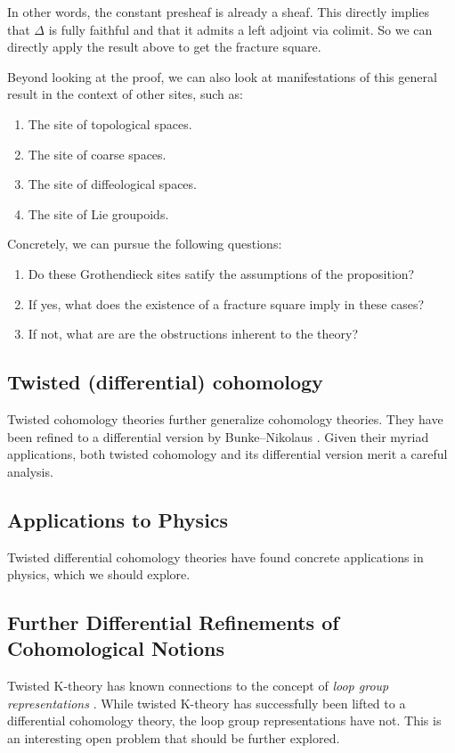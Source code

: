 \documentclass[10pt]{amsart}
\theoremstyle{definition}
\theoremstyle{remark}
\numberwithin{equation}{section}
\begin{document}
In other words, the constant presheaf is already a sheaf. This directly implies that $\Delta$ is fully faithful and that it admits a left adjoint via colimit. So we can directly apply the result above to get the fracture square.

Beyond looking at the proof, we can also look at manifestations of this general result in the context of other sites, such as:
\begin{enumerate}
  \item The site of topological spaces.
  \item The site of coarse spaces.
  \item The site of diffeological spaces.
  \item The site of Lie groupoids.
\end{enumerate}

Concretely, we can pursue the following questions:
\begin{enumerate}
  \item Do these Grothendieck sites satify the assumptions of the proposition?
  \item If yes, what does the existence of a fracture square imply in these cases?
  \item If not, what are are the obstructions inherent to the theory?
\end{enumerate}

\subsection{Twisted (differential) cohomology}
Twisted cohomology theories further generalize cohomology theories. They have been refined to a differential version by Bunke--Nikolaus \cite{bunkenikolaus2019twisted}. Given their myriad applications, both twisted cohomology and its differential version merit a careful analysis.

\subsection{Applications to Physics}
Twisted differential cohomology theories have found concrete applications in physics, which we should explore.

\subsection{Further Differential Refinements of Cohomological Notions}
Twisted K-theory has known connections to the concept of \emph{loop group representations} \cite{freedhopkinsteleman2011loopgroupsi}. While twisted K-theory has successfully been lifted to a differential cohomology theory, the loop group representations have not. This is an interesting open problem that should be further explored.
\end{document}
